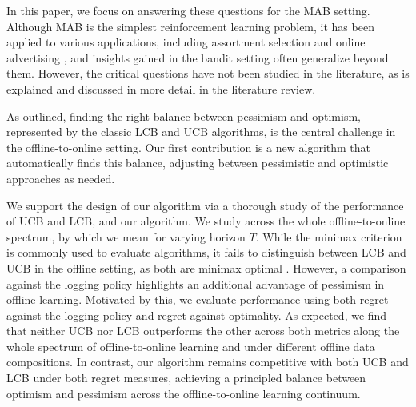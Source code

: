 In this paper, we focus on answering these questions for the MAB setting. Although MAB is the simplest reinforcement learning problem, it has been applied to various applications, including assortment selection and online advertising \citep{caro2007dynamic,pandey2007bandits, gur2020adaptive}, and insights gained in the bandit setting often generalize beyond them. However, the critical questions have not been studied in the literature, as is explained and discussed in more detail in the literature review.

As outlined, finding the right balance between pessimism and optimism, represented by the classic LCB and UCB algorithms, is the central challenge in the offline-to-online setting. Our first contribution is a new algorithm that automatically finds this balance, adjusting between pessimistic and optimistic approaches as needed. 

We support the design of our algorithm via a thorough study of the performance of UCB and LCB, and our algorithm. We study across the whole offline-to-online spectrum, by which we mean for varying horizon $T$.  While the minimax criterion is commonly used to evaluate algorithms, it fails to distinguish between LCB and UCB in the offline setting, as both are minimax optimal \citep{xiao2021optimalitybatchpolicyoptimization}. However, a comparison against the logging policy highlights an additional advantage of pessimism in offline learning. Motivated by this, we evaluate performance using both regret against the logging policy and regret against optimality. 
As expected, we find that neither  UCB nor LCB outperforms the other across both metrics along the whole spectrum of offline-to-online learning and under different offline data compositions. In contrast, our algorithm remains competitive with both UCB and LCB under both regret measures, achieving a principled balance between optimism and pessimism across the offline-to-online learning continuum.

